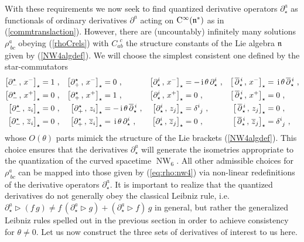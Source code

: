 \documentclass[11pt,a4paper]{article}
\DeclareMathOperator{\NW}{NW}
\newcommand{\1}{\mathbb{1}}
\def\ii{{\,{\rm i}\,}}
\def\CC{{\rm C}}
\def\mfn{{\mathfrak n}}
\begin{document}
With these requirements we now seek to find quantized derivative
operators $\partial_\star^a$ as functionals of ordinary derivatives
$\partial^a$ acting on $\CC^\infty(\mfn^*)$ as in
(\ref{commtranslaction}). However, there are (uncountably) infinitely
many solutions $\rho^a_{~bc}$ obeying (\ref{rhoCrels}) with
$C_{ab}^{~~c}$ the structure constants of the Lie algebra $\mfn$ given
by (\ref{NW4algdef}). We will choose the simplest consistent one
defined by the star-commutators
\begin{align}
  \nonumber
  \left[\partial_-^\star\,,\,x^-\right]_\star&=1 \ ,
  &\left[\partial_+^\star\,,\,x^-\right]_\star&=0 \ ,
  &\left[\partial_\star^i\,,\,x^-\right]_\star&=-\ii\theta\,\partial_\star^i \ ,
  &\left[\,\overline{\partial}{}_\star^{\,i}\,,\,x^-\right]_\star&=
  \ii\theta\,\overline{\partial}{}_\star^{\,i} \ ,
  \\ \nonumber
  \left[\partial_-^\star\,,\,x^+\right]_\star&=0 \ ,
  &\left[\partial_+^\star\,,\,x^+\right]_\star &=1 \ ,
  &\left[\partial_\star^i\,,\,x^+\right]_\star&=0 \ ,
  &\left[\,\overline{\partial}{}_\star^{\,i}\,,\,x^+\right]_\star&=0 \ ,
  \\ \nonumber
  \left[\partial_-^\star\,,\,z_i\right]_\star&=0 \ ,
  &\left[\partial_+^\star\,,\,z_i\right]_\star&=-\ii\theta\,
  \overline{\partial}{}^{\,i}_\star \ ,
  &\left[\partial_\star^i\,,\,z_j\right]_\star&=\delta^i_{~j} \ ,
  &\left[\,\overline{\partial}{}_\star^{\,i}\,,\,z_j\right]_\star&=0 \ ,
  \\
  \left[\partial_-^\star\,,\,\overline{z}_i\right]_\star&=0  \ ,
  &\left[\partial_+^\star\,,\,\overline{z}_i\right]_\star&=
  \ii\theta\,\partial_\star^i \ ,
  &\left[\partial_\star^i\,,\,\overline{z}_j\right]_\star&=0 \ ,
  &\left[\,\overline{\partial}{}_\star^{\,i}\,,\,\overline{z}_j\right]_\star&
  =\delta^i_{~j} \ ,
\label{eq:rho:nw4}\end{align}
whose $O(\theta)$ parts mimick the structure of the Lie brackets
(\ref{NW4algdef}). This choice ensures that the derivatives
$\partial_\star^a$ will generate the isometries appropriate to the
quantization of the curved spacetime $\NW_6$. All other admissible
choices for $\rho^a_{~bc}$ can
be mapped into those given by (\ref{eq:rho:nw4}) via non-linear
redefinitions of the derivative operators $\partial^a_\star$. It is
important to realize that the quantized derivatives do not generally
obey the classical Leibniz rule,
i.e. $\partial_\star^a\triangleright(f\,g)\neq
f\,(\partial_\star^a\triangleright g)+(\partial_\star^a\triangleright
f)\,g$ in general, but rather the generalized Leibniz rules spelled
out in the previous section in order to achieve consistency for
$\theta\neq0$. Let us now construct the three sets of derivatives of
interest to us here.
\end{document}

